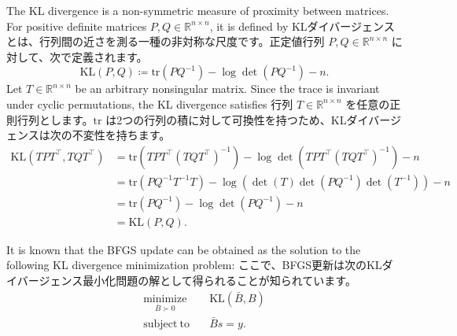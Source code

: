 \documentclass[0_main]{subfiles}
\begin{document}
\ifEn
    The KL divergence is a non-symmetric measure of proximity between matrices. For positive definite matrices $P,Q \in \mathbb{R}^{n \times n}$, it is defined by
\else
    KLダイバージェンスとは、行列間の近さを測る一種の非対称な尺度です。正定値行列 $P,Q \in \mathbb{R}^{n \times n}$ に対して、次で定義されます。
\fi
\begin{equation*}
    \mathrm{KL}(P,Q) \coloneqq \mathrm{tr}(P Q^{-1}) - \log\det(P Q^{-1}) - n.
\end{equation*}
\ifEn
    Let $T \in \mathbb{R}^{n \times n}$ be an arbitrary nonsingular matrix. Since the trace is invariant under cyclic permutations, the KL divergence satisfies
\else
    行列 $T \in \mathbb{R}^{n \times n}$ を任意の正則行列とします。$\mathrm{tr}$ は2つの行列の積に対して可換性を持つため、KLダイバージェンスは次の不変性を持ちます。
\fi
\begin{align*}
    \mathrm{KL}(T P T^\top, T Q T^\top) & = \mathrm{tr}(T P T^\top (T Q T^\top)^{-1}) - \log\det(T P T^\top (T Q T^\top)^{-1}) - n \\
                                        & = \mathrm{tr}(P Q^{-1} T^{-1} T) - \log (\det(T) \det(P Q^{-1}) \det(T^{-1})) - n        \\
                                        & = \mathrm{tr}(P Q^{-1}) - \log\det(P Q^{-1}) - n                                         \\
                                        & = \mathrm{KL}(P, Q).
\end{align*}

\ifEn
    It is known that the BFGS update can be obtained as the solution to the following KL divergence minimization problem:
\else
    ここで、BFGS更新は次のKLダイバージェンス最小化問題の解として得られることが知られています\citep[Section 7.2.4]{kanamori2016continuous}。
\fi
\begin{align*}
    \underset{\bar{B} \succ 0}{\mathrm{minimize}}
     & \quad \mathrm{KL}(\bar{B}, B) \\
    \mathrm{subject\ to}
     & \quad \bar{B}s = y.
\end{align*}
\end{document}

